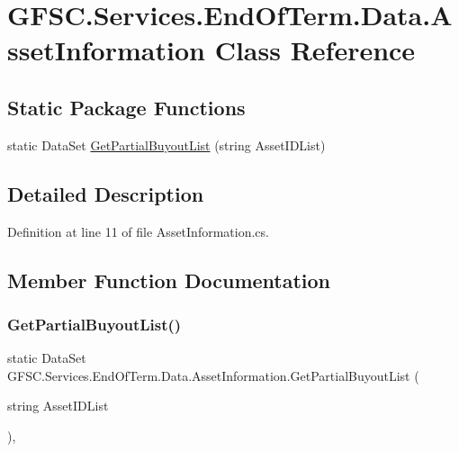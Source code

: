 \hypertarget{class_g_f_s_c_1_1_services_1_1_end_of_term_1_1_data_1_1_asset_information}{}\section{G\+F\+S\+C.\+Services.\+End\+Of\+Term.\+Data.\+Asset\+Information Class Reference}
\label{class_g_f_s_c_1_1_services_1_1_end_of_term_1_1_data_1_1_asset_information}
\subsection*{Static Package Functions}
\begin{DoxyCompactItemize}
\item 
static Data\+Set \mbox{\hyperlink{class_g_f_s_c_1_1_services_1_1_end_of_term_1_1_data_1_1_asset_information_a34abad46802ad18f5fa75c2ba0787bfa}{Get\+Partial\+Buyout\+List}} (string Asset\+I\+D\+List)
\end{DoxyCompactItemize}


\subsection{Detailed Description}


Definition at line 11 of file Asset\+Information.\+cs.



\subsection{Member Function Documentation}
\mbox{\label{class_g_f_s_c_1_1_services_1_1_end_of_term_1_1_data_1_1_asset_information_a34abad46802ad18f5fa75c2ba0787bfa}} 
\subsubsection{\texorpdfstring{Get\+Partial\+Buyout\+List()}{GetPartialBuyoutList()}}
{\footnotesize\ttfamily static Data\+Set G\+F\+S\+C.\+Services.\+End\+Of\+Term.\+Data.\+Asset\+Information.\+Get\+Partial\+Buyout\+List (\begin{DoxyParamCaption}\item[{string}]{Asset\+I\+D\+List }\end{DoxyParamCaption})\hspace{0.3cm}{\ttfamily [static]}, {\ttfamily [package]}}



